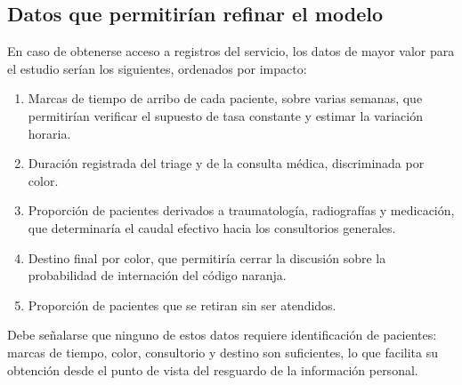 \subsection{Datos que permitirían refinar el modelo}

En caso de obtenerse acceso a registros del servicio, los datos de mayor
valor para el estudio serían los siguientes, ordenados por impacto:

\begin{enumerate}
  \item Marcas de tiempo de arribo de cada paciente, sobre varias semanas, que
  permitirían verificar el supuesto de tasa constante y estimar la variación
  horaria.
  \item Duración registrada del triage y de la consulta médica, discriminada
  por color.
  \item Proporción de pacientes derivados a traumatología, radiografías y
  medicación, que determinaría el caudal efectivo hacia los consultorios
  generales.
  \item Destino final por color, que permitiría cerrar la discusión sobre la
  probabilidad de internación del código naranja.
  \item Proporción de pacientes que se retiran sin ser atendidos.
\end{enumerate}

Debe señalarse que ninguno de estos datos requiere identificación de
pacientes: marcas de tiempo, color, consultorio y destino son suficientes, lo
que facilita su obtención desde el punto de vista del resguardo de la
información personal.

